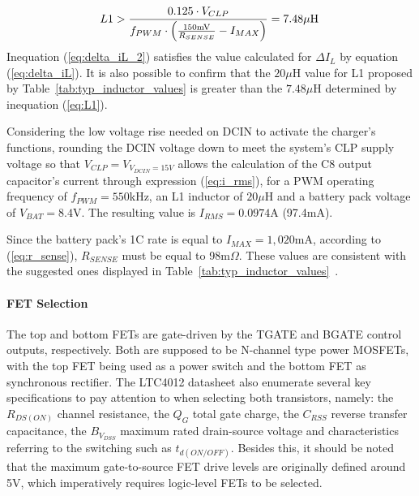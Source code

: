 \begin{equation}\label{eq:L1}
    L1 > \frac{0.125 \cdot V_{CLP}}{f_{PWM} \cdot \left(\frac{150 \textrm{mV}}{R_{SENSE}} - I_{MAX}\right)} = 7.48 \mu\textrm{H} \,\medskip
\end{equation}
Inequation (\ref{eq:delta_iL_2}) satisfies the value calculated for $\Delta I_L$ by equation (\ref{eq:delta_iL}). It is also possible to confirm that the $20\mu$H value for L1 proposed by Table~\ref{tab:typ_inductor_values} is greater than the $7.48 \mu$H determined by inequation (\ref{eq:L1}).

Considering the low voltage rise needed on DCIN to activate the charger's functions, rounding the DCIN voltage down to meet the system's CLP supply voltage so that $V_{CLP}=V_{V_{DCIN}=15V}$ allows the calculation of the C8 output capacitor's current through expression (\ref{eq:i_rms}), for a PWM operating frequency of $f_{PWM}=550$kHz, an L1 inductor of $20 \mu$H and a battery pack voltage of $V_{BAT}=8.4$V. The resulting value is $I_{RMS}=0.0974$A (97.4mA).

Since the battery pack's 1C rate is equal to $I_{MAX}=1,020$mA, according to (\ref{eq:r_sense}), $R_{SENSE}$ must be equal to 98m$\Omega$. These values are consistent with the suggested ones displayed in Table~\ref{tab:typ_inductor_values}~\cite{LTC4012}.

\paragraph{FET Selection}	The top and bottom FETs are gate-driven by the TGATE and BGATE control outputs, respectively. Both are supposed to be N-channel type power MOSFETs, with the top FET being used as a power switch and the bottom FET as synchronous rectifier. The LTC4012 datasheet also enumerate several key specifications to pay attention to when selecting both transistors, namely: the $R_{DS(ON)}$ channel resistance, the $Q_G$ total gate charge, the $C_{RSS}$ reverse transfer capacitance, the $B_{V_{DSS}}$ maximum rated drain-source voltage and characteristics referring to the switching such as $t_{d(ON/OFF)}$. Besides this, it should be noted that the maximum gate-to-source FET drive levels are originally defined around 5V, which imperatively requires logic-level FETs to be selected.

